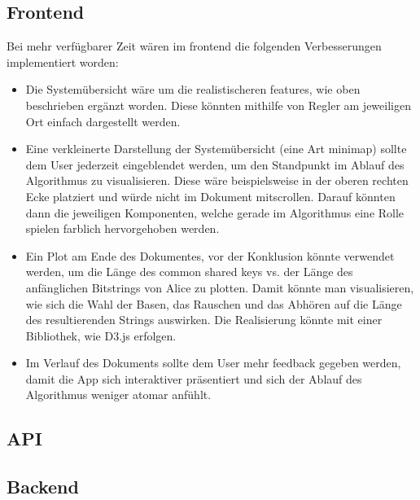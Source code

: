 \documentclass[a4paper,10.2pt,pdftex]{scrartcl}%
\begin{document}
\subsection{Frontend}

Bei mehr verfügbarer Zeit wären im frontend die folgenden Verbesserungen implementiert worden:
\begin{itemize}
\item Die Systemübersicht wäre um die realistischeren features, wie oben beschrieben ergänzt worden. Diese könnten mithilfe von Regler am jeweiligen Ort einfach dargestellt werden.
\item Eine verkleinerte Darstellung der Systemübersicht (eine Art minimap) sollte dem User jederzeit eingeblendet werden, um den Standpunkt im Ablauf des Algorithmus zu visualisieren. Diese wäre beispielsweise in der oberen rechten Ecke platziert und würde nicht im Dokument mitscrollen. Darauf könnten dann die jeweiligen Komponenten, welche gerade im Algorithmus eine Rolle spielen farblich hervorgehoben werden.
\item Ein Plot am Ende des Dokumentes, vor der Konklusion könnte verwendet werden, um die Länge des common shared keys vs. der Länge des anfänglichen Bitstrings von Alice zu plotten. Damit könnte man visualisieren, wie sich die Wahl der Basen, das Rauschen und das Abhören auf die Länge des resultierenden Strings auswirken. Die Realisierung könnte mit einer Bibliothek, wie D3.js erfolgen.
\item Im Verlauf des Dokuments sollte dem User mehr feedback gegeben werden, damit die App sich interaktiver präsentiert und sich der Ablauf des Algorithmus weniger atomar anfühlt.
\end{itemize}
\subsection{API}
\subsection{Backend}


\newpage
\nocite{*}	

 


\appendix




\end{document}
